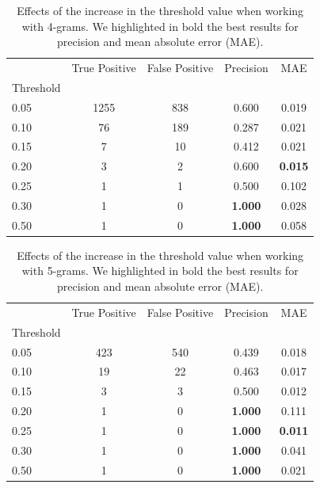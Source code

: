 \documentclass[runningheads]{llncs}
\begin{document}
\begin{table}
  \caption{Effects of the increase in the threshold value when working with 4-grams. We highlighted in bold the best results for precision and mean absolute error (MAE).}
  \label{tab:experiments:threshold_k4}
  \centering
  \begin{tabular}{lcccc}
    \toprule
    {} &  True Positive &  False Positive &  Precision &    MAE \\
    Threshold &                &                 &            &        \\
    \midrule
    0.05      &           1255 &             838 &      0.600 &  0.019 \\
    0.10      &             76 &             189 &      0.287 &  0.021 \\
    0.15     &              7 &              10 &      0.412 &  0.021 \\
    0.20      &              3 &               2 &      0.600 &  \textbf{0.015} \\
    0.25      &              1 &               1 &      0.500 &  0.102 \\
    0.30      &              1 &               0 &      \textbf{1.000} &  0.028 \\
    0.50      &              1 &               0 &      \textbf{1.000} &  0.058 \\
    \bottomrule
    \end{tabular}
\end{table}

\begin{table}
  \caption{Effects of the increase in the threshold value when working with 5-grams. We highlighted in bold the best results for precision and mean absolute error (MAE).}
  \label{tab:experiments:threshold_k5}
  \centering
  \begin{tabular}{lcccc}
    \toprule
    {} &  True Positive &  False Positive &  Precision &    MAE \\
    Threshold &                &                 &            &        \\
    \midrule
    0.05      &            423 &             540 &      0.439 &  0.018 \\
    0.10      &             19 &              22 &      0.463 &  0.017 \\
    0.15      &              3 &               3 &      0.500 &  0.012 \\
    0.20      &              1 &               0 &      \textbf{1.000} &  0.111 \\
    0.25      &              1 &               0 &      \textbf{1.000} &  \textbf{0.011} \\
    0.30      &              1 &               0 &      \textbf{1.000} &  0.041 \\
    0.50      &              1 &               0 &      \textbf{1.000} &  0.021 \\
    \bottomrule
    \end{tabular}
\end{table}
\end{document}
